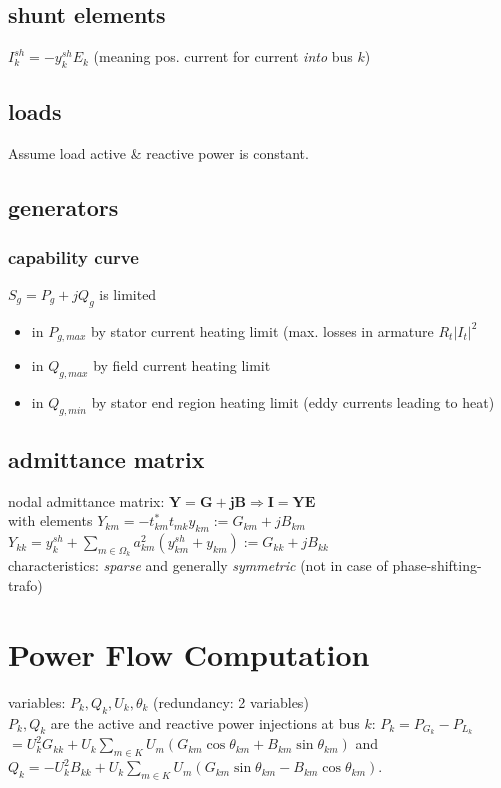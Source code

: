 \documentclass[a4paper,10pt,landscape]{scrartcl}
\begin{document}
\begin{multicols*}{3}
\subsection{shunt elements}
$I_k^{sh}=-y_k^{sh}E_k$ (meaning pos. current for current \textit{into} bus $k$)

\subsection{loads}
Assume load active \& reactive power is constant.
\subsection{generators}
\subsubsection{capability curve}
$S_g=P_g + jQ_g$ is limited
\begin{itemize}
    \item in $P_{g,max}$ by stator current heating limit (max. losses in armature $R_t|I_t|^2$
    \item in $Q_{g,max}$ by field current heating limit
    \item in $Q_{g,min}$ by stator end region heating limit (eddy currents leading to heat)
\end{itemize}

\subsection{admittance matrix}
nodal admittance matrix: $\mathbf{Y=G+jB}\Rightarrow\mathbf{I=YE}$ \\
with elements
$Y_{km} = -t_{km}^*t_{mk}y_{km}:=G_{km} + jB_{km}$ \\
$Y_{kk} = y_k^{sh}+\underset{m\in\Omega_k}{\sum}a_{km}^2(y_{km}^{sh} + y_{km}):=G_{kk} + jB_{kk}$ \\
characteristics: \textit{sparse} and generally \textit{symmetric} (not in case of phase-shifting-trafo)

\section{Power Flow Computation}
variables: $P_k,Q_k,U_k,\theta_k$ (redundancy: 2 variables) \\
$P_k,Q_k$ are the active and reactive power injections at bus $k$: 
$P_k=P_{G_{k}} - P_{L_{k}}$ \\
$=U_k^2G_{kk}+U_k \sum_{m \in K} U_m\left(G_{k m} \cos \theta_{k m}+B_{k m} \sin \theta_{k m}\right)$ and \\
$Q_k =  -U_k^2B_{kk} + U_k \sum_{m \in K} U_m\left(G_{k m} \sin \theta_{k m}-B_{k m} \cos \theta_{k m}\right)$.


\end{multicols*}
\end{document}
